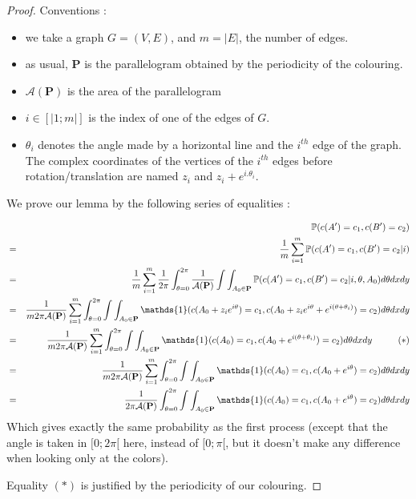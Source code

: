 \documentclass[a4paper,11pt]{article}
\theoremstyle{definition}
\theoremstyle{remark}
\begin{document}
\begin{proof}
Conventions : 
\begin{itemize}
\item we take a graph $G=(V,E)$, and $m = |E|$, the number of edges.

\item as usual, $\mathbf{P}$ is the parallelogram obtained by the periodicity 
of the colouring.

\item $\mathcal{A}(\mathbf{P})$ is the area of the parallelogram

\item $i \in [|1;m|]$ is the index of one of the edges of $G$.

\item $\theta_i$ denotes the angle made by a horizontal line and the $i^{th}$ 
edge of the graph. The 
complex coordinates of the vertices of the $i^{th}$ edges before 
rotation/translation are named $z_i $ and $z_i + e^{i.\theta_i}$.

\end{itemize}

We prove our lemma by the following series of equalities :

\begin{eqnarray*}
& & \mathbb{P}(c(A') = c_1, c(B') = c_2) \\
  &=& \frac{1}{m}\sum_{i=1}^{m} \mathbb{P}(c(A') = c_1, c(B') = c_2 | i)  \\
  &=& \frac{1}{m}\sum_{i=1}^{m}  \frac{1}{2\pi}\int_{\theta =0} ^{2\pi} \frac{1}{\mathcal{A}(\mathbf{P})}\int\int_{A_0 \in \mathbf{P}} \mathbb{P}(c(A') = c_1, c(B') = c_2 | i, \theta, A_0) d\theta dx dy \\  
  &=& \frac{1}{m 2\pi \mathcal{A}(\mathbf {P})}\sum_{i=1}^{m}\int_{\theta =0} ^{2\pi} \int\int_{A_0 \in \mathbf{P}} \mathds{1}(c(A_0 + z_i e^{i\theta}) = c_1, c(A_0 +z_i e^{i\theta} + e^{i (\theta + \theta_i)}) = c_2) d\theta dx dy \\  
    &=& \frac{1}{m 2\pi \mathcal{A}(\mathbf{P})}\sum_{i=1}^{m} \int_{\theta =0} ^{2\pi} \int\int_{A_0 \in \mathbf{P}} \mathds{1}(c(A_0) = c_1, c(A_0 + e^{i (\theta + \theta_i)}) = c_2 ) d\theta dx dy \hspace{1 cm} (*)\\ 
    &=& \frac{1}{m 2\pi \mathcal{A}(\mathbf{P})}\sum_{i=1}^{m} \int_{\theta =0} ^{2\pi} \int\int_{A_0 \in \mathbf{P}} \mathds{1}(c(A_0) = c_1, c(A_0 + e^{i \theta}) = c_2 ) d\theta dx dy \\ 
    &=& \frac{1}{2\pi \mathcal{A}(\mathbf{P})}\int_{\theta =0} ^{2\pi} \int\int_{A_0 \in \mathbf{P}} \mathds{1}(c(A_0) = c_1, c(A_0 + e^{i \theta}) = c_2 ) d\theta dx dy \\ 
\end{eqnarray*}
Which gives exactly the same probability as the first process (except that the 
angle is taken in $[0;2\pi[$ here, instead of $[0;\pi[$, but it doesn't make 
any difference when looking only at the colors).

Equality $(*)$ is justified by the periodicity of our colouring.
\end{proof}
\end{document}
